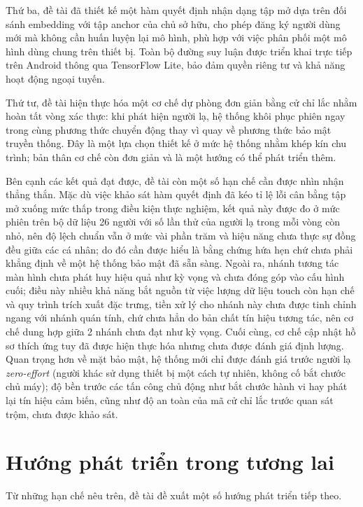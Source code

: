 \documentclass[../DoAn.tex]{subfiles}
\begin{document}
Thứ ba, đề tài đã thiết kế một hàm quyết định nhận dạng tập mở dựa trên đối sánh embedding với tập anchor của chủ sở hữu, cho phép đăng ký người dùng mới mà không cần huấn luyện lại mô hình, phù hợp với việc phân phối một mô hình dùng chung trên thiết bị. Toàn bộ đường suy luận được triển khai trực tiếp trên Android thông qua TensorFlow Lite, bảo đảm quyền riêng tư và khả năng hoạt động ngoại tuyến.

Thứ tư, đề tài hiện thực hóa một cơ chế dự phòng đơn giản bằng cử chỉ lắc nhằm hoàn tất vòng xác thực: khi phát hiện người lạ, hệ thống khôi phục phiên ngay trong cùng phương thức chuyển động thay vì quay về phương thức bảo mật truyền thống. Đây là một lựa chọn thiết kế ở mức hệ thống nhằm khép kín chu trình; bản thân cơ chế còn đơn giản và là một hướng có thể phát triển thêm.

Bên cạnh các kết quả đạt được, đề tài còn một số hạn chế cần được nhìn nhận thẳng thắn. Mặc dù việc khảo sát hàm quyết định đã kéo tỉ lệ lỗi cân bằng tập mở xuống mức thấp trong điều kiện thực nghiệm, kết quả này được đo ở mức phiên trên bộ dữ liệu 26 người với số lần thử của người lạ trong mỗi vòng còn nhỏ, nên độ lệch chuẩn vẫn ở mức vài phần trăm và hiệu năng chưa thực sự đồng đều giữa các cá nhân; do đó cần được hiểu là bằng chứng hứa hẹn chứ chưa phải khẳng định về một hệ thống bảo mật đã sẵn sàng. Ngoài ra, nhánh tương tác màn hình chưa phát huy hiệu quả như kỳ vọng và chưa đóng góp vào cấu hình cuối; điều này nhiều khả năng bắt nguồn từ việc lượng dữ liệu touch còn hạn chế và quy trình trích xuất đặc trưng, tiền xử lý cho nhánh này chưa được tinh chỉnh ngang với nhánh quán tính, chứ chưa hẳn do bản chất tín hiệu tương tác, nên cơ chế dung hợp giữa 2 nhánh chưa đạt như kỳ vọng. Cuối cùng, cơ chế cập nhật hồ sơ thích ứng tuy đã được hiện thực hóa nhưng chưa được đánh giá định lượng. Quan trọng hơn về mặt bảo mật, hệ thống mới chỉ được đánh giá trước người lạ \textit{zero-effort} (người khác sử dụng thiết bị một cách tự nhiên, không cố bắt chước chủ máy); độ bền trước các tấn công chủ động như bắt chước hành vi hay phát lại tín hiệu cảm biến, cũng như độ an toàn của mã cử chỉ lắc trước quan sát trộm, chưa được khảo sát.

\section{Hướng phát triển trong tương lai}
\label{sec:huongphattrien}

Từ những hạn chế nêu trên, đề tài đề xuất một số hướng phát triển tiếp theo.
\end{document}
